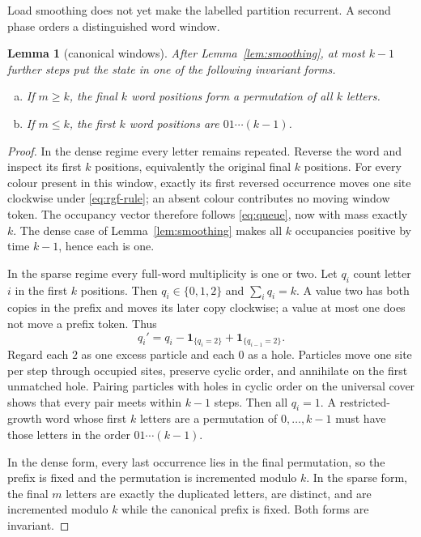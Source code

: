 \documentclass[a4paper,10pt]{amsart}
\newtheorem{lemma}[theorem]{Lemma}
\theoremstyle{definition}
\theoremstyle{remark}
\newcommand{\ind}{\mathbf 1}
\begin{document}
Load smoothing does not yet make the labelled partition recurrent.  A second
phase orders a distinguished word window.

\begin{lemma}[canonical windows]\label{lem:windows}
After Lemma~\ref{lem:smoothing}, at most $k-1$ further steps put the state in
one of the following invariant forms.
\begin{enumerate}[(a)]
\item If $m\ge k$, the final $k$ word positions form a permutation of all
$k$ letters.
\item If $m\le k$, the first $k$ word positions are $01\cdots(k-1)$.
\end{enumerate}
\end{lemma}

\begin{proof}
In the dense regime every letter remains repeated.  Reverse the word and
inspect its first $k$ positions, equivalently the original final $k$
positions.  For every colour present in this window, exactly its first
reversed occurrence moves one site clockwise under \eqref{eq:rgf-rule}; an
absent colour contributes no moving window token.  The occupancy vector
therefore follows \eqref{eq:queue}, now with mass exactly $k$.  The dense
case of Lemma~\ref{lem:smoothing} makes all $k$ occupancies positive by time
$k-1$, hence each is one.

In the sparse regime every full-word multiplicity is one or two.  Let $q_i$
count letter $i$ in the first $k$ positions.  Then
$q_i\in\{0,1,2\}$ and $\sum_iq_i=k$.  A value two has both copies in the
prefix and moves its later copy clockwise; a value at most one does not move
a prefix token.  Thus
\begin{equation}\label{eq:prefix-particles}
 q_i'=q_i-\ind_{\{q_i=2\}}+\ind_{\{q_{i-1}=2\}}.
\end{equation}
Regard each $2$ as one excess particle and each $0$ as a hole.  Particles
move one site per step through occupied sites, preserve cyclic order, and
annihilate on the first unmatched hole.  Pairing particles with holes in
cyclic order on the universal cover shows that every pair meets within
$k-1$ steps.  Then all $q_i=1$.  A restricted-growth word whose first $k$
letters are a permutation of $0,\ldots,k-1$ must have those letters in the
order $01\cdots(k-1)$.

In the dense form, every last occurrence lies in the final permutation, so
the prefix is fixed and the permutation is incremented modulo $k$.  In the
sparse form, the final $m$ letters are exactly the duplicated letters, are
distinct, and are incremented modulo $k$ while the canonical prefix is
fixed.  Both forms are invariant.
\end{proof}
\end{document}
